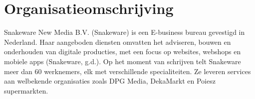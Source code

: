 \section{Organisatieomschrijving}
Snakeware New Media B.V. (Snakeware) is een E-business bureau gevestigd in Nederland. Haar
aangeboden diensten omvatten het adviseren, bouwen en onderhouden van digitale producties, met
een focus op websites, webshops en mobiele apps (Snakeware, g.d.).
Op het moment van schrijven telt Snakeware meer dan 60 werknemers, elk met verschillende specialiteiten.
Ze leveren services aan welbekende organisaties zoals DPG Media, DekaMarkt en Poiesz supermarkten.

